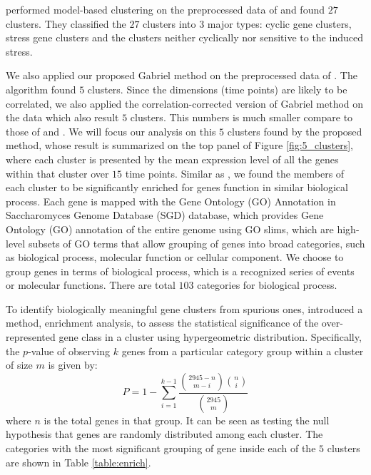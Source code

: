 \documentclass[12pt]{article}
\begin{document}
\cite{dortet2008model} performed model-based clustering on the preprocessed data of \cite{tavazoie1999systematic} and  found $27$ clusters. They classified the $27$ clusters into $3$ major types: cyclic gene clusters, stress gene clusters and the clusters neither cyclically nor sensitive to the induced stress. 

We also applied our proposed Gabriel method on the preprocessed data of \cite{tavazoie1999systematic}. The algorithm found $5$ clusters. Since the dimensions (time points) are likely to be correlated, we also applied the correlation-corrected version of Gabriel method on the data which also result $5$ clusters. This numbers is much smaller compare to those of \cite{tavazoie1999systematic} and \cite{dortet2008model}. We will focus our analysis on this $5$ clusters found by the proposed method, whose result is summarized on the top panel of Figure \ref{fig:5_clusters}, where each cluster is presented by the mean expression level of all the genes within that cluster over $15$ time points. Similar as \cite{tavazoie1999systematic}, we found the members of each cluster to be significantly enriched for genes function in similar biological process. Each gene is mapped with the Gene Ontology (GO) Annotation in Saccharomyces Genome Database (SGD) database, which provides Gene Ontology (GO) annotation of the entire genome using GO slims, which are high-level subsets of GO terms that allow grouping of genes into broad categories, such as biological process, molecular function or cellular component. We choose to group genes in terms of biological process, which is a recognized series of events or molecular functions. There are total $103$ categories for biological process.

To identify biologically meaningful gene clusters from spurious ones, \cite{tavazoie1999systematic} introduced a method, enrichment analysis, to assess the statistical significance of the over-represented gene class in a cluster using hypergeometric distribution. Specifically, the $p$-value of observing $k$ genes from a particular category group within a cluster of size $m$ is given by:
\[	P = 1-\sum^{k-1}_{i=1} \frac{{{2945-n}\choose{m-i}}{{n}\choose{i}} }{ {{2945} \choose{m}} }\] 
where $n$ is the total genes in that group. It can be seen as testing the null hypothesis that genes are randomly  distributed among each cluster. The categories with the most significant grouping of gene inside each of the $5$ clusters are shown in Table \ref{table:enrich}.
\end{document}
